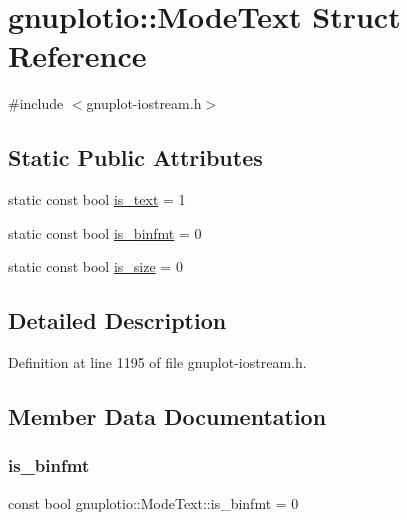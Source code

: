 \hypertarget{structgnuplotio_1_1_mode_text}{}\section{gnuplotio\+:\+:Mode\+Text Struct Reference}
\label{structgnuplotio_1_1_mode_text}


{\ttfamily \#include $<$gnuplot-\/iostream.\+h$>$}

\subsection*{Static Public Attributes}
\begin{DoxyCompactItemize}
\item 
static const bool \hyperlink{structgnuplotio_1_1_mode_text_a7083d8977c354a036a7c542bf99d3d52}{is\+\_\+text} = 1
\item 
static const bool \hyperlink{structgnuplotio_1_1_mode_text_a4c771363d894ae64d6af961ffde35126}{is\+\_\+binfmt} = 0
\item 
static const bool \hyperlink{structgnuplotio_1_1_mode_text_aaffc1e7bb26c6d1404cb5a3f03f13be9}{is\+\_\+size} = 0
\end{DoxyCompactItemize}


\subsection{Detailed Description}


Definition at line 1195 of file gnuplot-\/iostream.\+h.



\subsection{Member Data Documentation}
\mbox{\label{structgnuplotio_1_1_mode_text_a4c771363d894ae64d6af961ffde35126}} 
\subsubsection{\texorpdfstring{is\+\_\+binfmt}{is\_binfmt}}
{\footnotesize\ttfamily const bool gnuplotio\+::\+Mode\+Text\+::is\+\_\+binfmt = 0\hspace{0.3cm}{\ttfamily [static]}}



